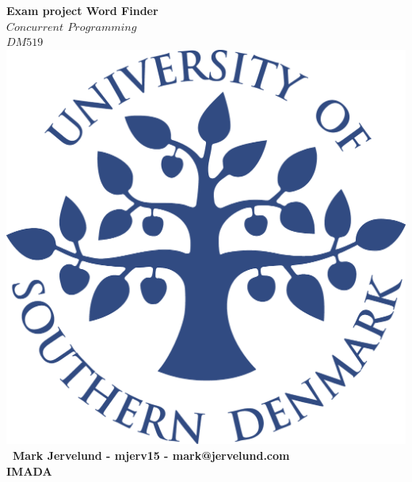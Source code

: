 \documentclass[a4paper,10pt,titlepage]{report}
\date{}
\begin{document}
\begin{titlepage}
\centering
    \vspace*{2\baselineskip}
    \huge
    \bfseries
    Exam project Word Finder \\

    \normalfont
	\huge
     \(Concurrent\)  \(Programming\) \\ \( DM519\)  \\ [3\baselineskip]
    \normalfont
	\includegraphics[scale=0.2]{SDU_logo}\\
	 
	
        \vfill\
    Mark Jervelund - mjerv15 - mark@jervelund.com \\
    \vspace{10mm}
    IMADA \\
    \vspace{5mm}
    \textbf{\datedate}  \bf{} \\[2\baselineskip]
\end{titlepage}
\newpage

\setcounter{page}{1}
\renewcommand{\thepage}{\arabic{page}}
\end{document}
